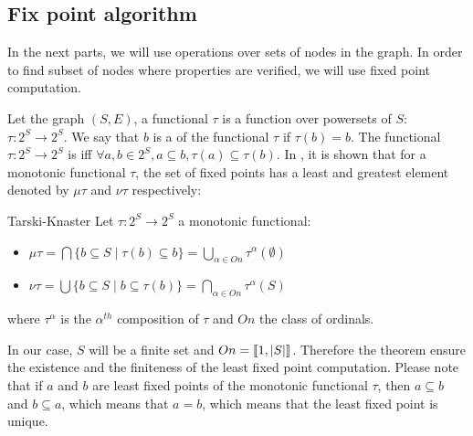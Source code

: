 \subsection{Fix point algorithm}

In the next parts, we will use operations over sets of nodes in the graph. In order to find subset of nodes where properties are verified, we will use fixed point computation.

Let the graph $(S,E)$, a functional $\tau$ is a function over powersets of $S$: $\tau: 2^S \rightarrow 2^S$. We say that $b$ is a  of the functional $\tau$ if $\tau(b) = b$.
The functional $\tau: 2^S \rightarrow 2^S$ is   iff $\forall a,b \in 2^S, a \subseteq b, \tau(a) \subseteq \tau(b)$.
In \cite{tarski}, it is shown that for a monotonic functional $\tau$, the set of fixed points has a least and greatest element denoted by $\mu \tau$ and $\nu \tau$ respectively:
\begin{namedtheo}{Tarski-Knaster}\label{th:tarski}
Let $\tau:2^S \rightarrow 2^S$ a monotonic functional:
\begin{itemize}[noitemsep,nolistsep]
\item $\mu \tau = \bigcap \{b \subseteq S \mid \tau(b) \subseteq b\} = \bigcup_{\alpha \in On} \tau^{\alpha}(\emptyset)$
\item $\nu \tau = \bigcup \{b \subseteq S \mid b \subseteq \tau(b) \} = \bigcap_{\alpha \in On} \tau^{\alpha}(S)$
\end{itemize}
where $\tau^{\alpha}$ is the $\alpha^{th}$ composition of $\tau$ and $On$ the class of ordinals.
\end{namedtheo}
In our case, $S$ will be a finite set and $On = \left \llbracket 1,|S|\right \rrbracket$. 
Therefore the theorem ensure the existence and the finiteness of the least fixed point computation.
Please note that if $a$ and $b$ are least fixed points of the monotonic functional $\tau$, then $a \subseteq b$ and $b \subseteq a$, which means that $a=b$, which means that the least fixed point is unique.

